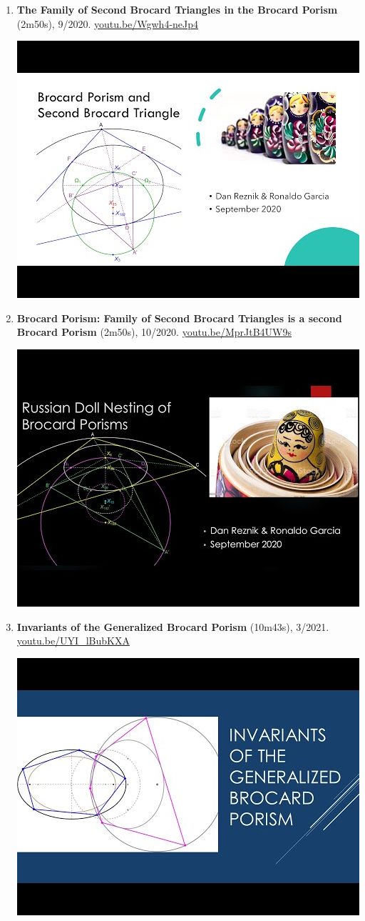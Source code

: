 \documentclass[12pt]{article}
\begin{document}
\begin{enumerate}[resume]
% 
\item \textbf{The Family of Second Brocard Triangles in the Brocard Porism} (2m50s), 9/2020. \href{https://youtu.be/Wgwh4-neJp4}{\url{youtu.be/Wgwh4-neJp4}}
\begin{center}\includegraphics[width=.5\textwidth]{pics/Wgwh4-neJp4.jpg}\end{center}
% 
\item \textbf{Brocard Porism: Family of Second Brocard Triangles is a second Brocard Porism} (2m50s), 10/2020. \href{https://youtu.be/MprJtB4UW9s}{\url{youtu.be/MprJtB4UW9s}}
\begin{center}\includegraphics[width=.5\textwidth]{pics/MprJtB4UW9s.jpg}\end{center}
% 
\item \textbf{Invariants of the Generalized Brocard Porism} (10m43s), 3/2021. \href{https://youtu.be/UYI_lBubKXA}{\url{youtu.be/UYI\_lBubKXA}}
\begin{center}\includegraphics[width=.5\textwidth]{pics/UYI_lBubKXA.jpg}\end{center}
% 
\end{enumerate}
\end{document}

